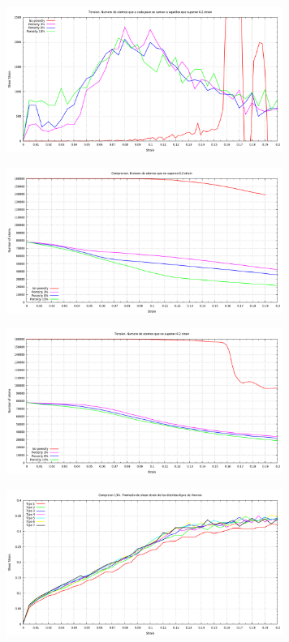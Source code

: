 \documentclass[10pt, oneside]{article} %
\begin{document}
\begin{figure}[H]
\centering
\includegraphics[width=9cm]{Figures/Porosidad_ss_4.png}
\caption{}
\end{figure}

\begin{figure}[H]
\centering
\includegraphics[width=9cm]{Figures/Porosidad_ss_5.png}
\caption{}
\end{figure}

\begin{figure}[H]
\centering
\includegraphics[width=9cm]{Figures/Porosidad_ss_6.png}
\caption{}
\end{figure}

\begin{figure}[H]
\centering
\includegraphics[width=9cm]{Figures/Porosidad_ss_7.png}
\caption{}
\end{figure}
\end{document}
